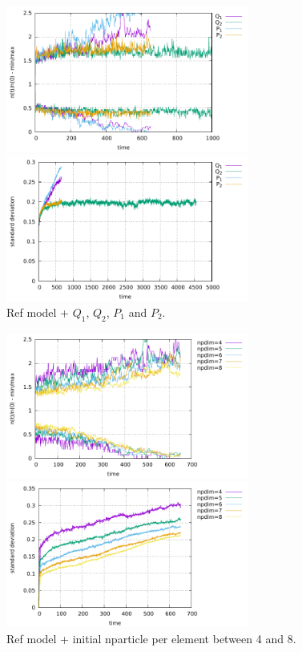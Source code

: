 \begin{center}
\includegraphics[width=8cm]{python_codes/fieldstone_30/results_dh/markercount_q12}
\includegraphics[width=8cm]{python_codes/fieldstone_30/results_dh/stdev_q12}\\
{\captionfont Ref model + $Q_1$, $Q_2$, $P_1$ and $P_2$. }
\end{center}

\begin{center}
\includegraphics[width=8cm]{python_codes/fieldstone_30/results_dh/markercount_npd}
\includegraphics[width=8cm]{python_codes/fieldstone_30/results_dh/stdev_npd}\\
{\captionfont Ref model + initial nparticle per element between 4 and 8.}
\end{center}

